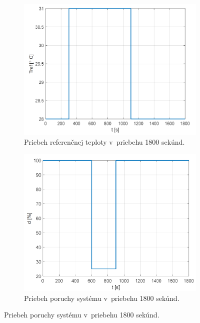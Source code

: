 \documentclass{article}
\begin{document}
\begin{figure}[!htbp]
	\begin{subfigure}{0.5\textwidth}
		\includegraphics[width=\textwidth]{./include/ziadanaHodnota.png}
		\caption{Priebeh referenčnej teploty v~priebehu 1800 sekúnd.}
		\label{fig:ziadanaHodnota}
	\end{subfigure}
	\hfill
	\begin{subfigure}{0.5\textwidth}
		\includegraphics[width=\textwidth]{./include/porucha.png}
		\caption{Priebeh poruchy systému v~priebehu 1800 sekúnd.}
		\label{fig:porucha}
	\end{subfigure}
\end{figure}
\end{document}
